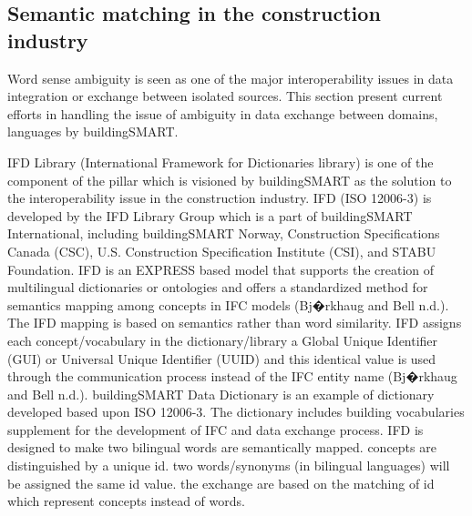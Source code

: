 \documentclass[Journal, InsideFigs, DoubleSpace]{ascelike} %
\begin{document}
\subsection{Semantic matching in the construction industry}
Word sense ambiguity is seen as one of the major interoperability issues in data integration or exchange between isolated sources. This section present current efforts in handling the issue of ambiguity in data exchange between domains, languages by buildingSMART.
\par
IFD Library (International Framework for Dictionaries library) is one of the component of the pillar which is visioned by buildingSMART as the solution to the interoperability issue in the construction industry. IFD (ISO 12006-3) is developed by the IFD Library Group which is a part of buildingSMART International, including buildingSMART Norway, Construction Specifications Canada (CSC), U.S. Construction Specification Institute (CSI), and STABU Foundation.  IFD is an EXPRESS based model that supports the creation of multilingual dictionaries or ontologies and offers a standardized method for semantics mapping among concepts in IFC models (Bj�rkhaug and Bell n.d.). The IFD mapping is based on semantics rather than word similarity. IFD assigns each concept/vocabulary in the dictionary/library a Global Unique Identifier (GUI) or Universal Unique Identifier (UUID) and this identical value is used through the communication process instead of the IFC entity name (Bj�rkhaug and Bell n.d.). buildingSMART Data Dictionary is an example of dictionary developed based upon ISO 12006-3. The dictionary includes building vocabularies supplement for the development of IFC and data exchange process. IFD is designed to make two bilingual words are semantically mapped. concepts are distinguished by a unique id. two words/synonyms (in bilingual languages) will be assigned the same id value. the exchange are based on the matching of id which represent concepts instead of words. 
\end{document}
